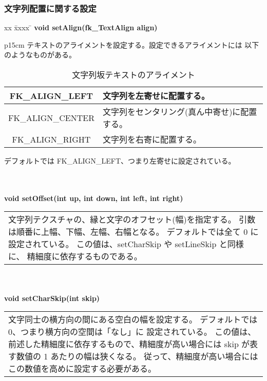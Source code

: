 \subsubsection{文字列配置に関する設定}
\begin{tabbing}
xx \= xxxx \= \kill
\> \textbf{void setAlign(fk\_TextAlign align)} \\
	\> \> \begin{tabular}{p{15cm}}
		テキストのアライメントを設定する。設定できるアライメントには
		以下のようなものがある。
			\begin{table}[H]
			\caption{文字列坂テキストのアライメント}
			\label{tbl:textAlign}
			\begin{center}
			\begin{tabular}{|c|l|}
			\hline
			FK\_ALIGN\_LEFT & 文字列を左寄せに配置する。\\ \hline
			FK\_ALIGN\_CENTER &
			文字列をセンタリング(真ん中寄せ)に配置する。\\ \hline
			FK\_ALIGN\_RIGHT & 文字列を右寄に配置する。\\ \hline
			\end{tabular}
			\end{center}
			\end{table}
		デフォルトでは FK\_ALIGN\_LEFT、つまり左寄せに設定されている。
	\end{tabular} \\ \\

\> \textbf{void setOffset(int up, int down, int left, int right)} \\
	\> \> \begin{tabular}{p{15cm}}
		文字列テクスチャの、縁と文字のオフセット(幅)を指定する。
		引数は順番に上幅、下幅、左幅、右幅となる。
		デフォルトでは全て 0 に設定されている。
		この値は、setCharSkip や setLineSkip と同様に、
		精細度に依存するものである。
	\end{tabular} \\ \\

\> \textbf{void setCharSkip(int skip)} \\
	\> \> \begin{tabular}{p{15cm}}
		文字同士の横方向の間にある空白の幅を設定する。
		デフォルトでは 0、つまり横方向の空間は「なし」に
		設定されている。
		この値は、前述した精細度に依存するもので、精細度が高い場合には
		skip が表す数値の 1 あたりの幅は狭くなる。
		従って、精細度が高い場合には
		この数値を高めに設定する必要がある。
	\end{tabular} \\ \\


\end{tabbing}
